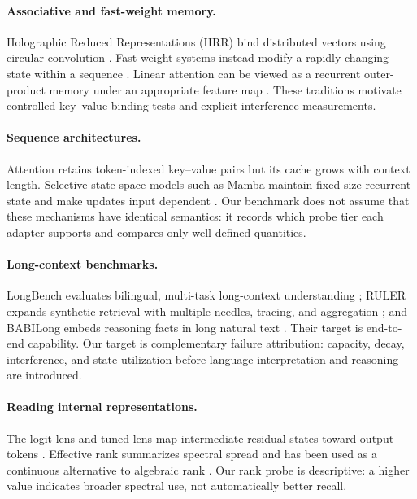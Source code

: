 \documentclass[10pt,twocolumn]{article}
\begin{document}
\paragraph{Associative and fast-weight memory.}
Holographic Reduced Representations (HRR) bind distributed vectors using
circular convolution \cite{plate1995hrr}.  Fast-weight systems instead modify
a rapidly changing state within a sequence
\cite{schmidhuber1992fastweights,ba2016fastweights}.  Linear attention can be
viewed as a recurrent outer-product memory under an appropriate feature map
\cite{katharopoulos2020linear}.  These traditions motivate controlled
key--value binding tests and explicit interference measurements.

\paragraph{Sequence architectures.}
Attention retains token-indexed key--value pairs but its cache grows with
context length.  Selective state-space models such as Mamba maintain
fixed-size recurrent state and make updates input dependent
\cite{gu2023mamba}.  Our benchmark does not assume that these mechanisms have
identical semantics: it records which probe tier each adapter supports and
compares only well-defined quantities.

\paragraph{Long-context benchmarks.}
LongBench evaluates bilingual, multi-task long-context understanding
\cite{bai2023longbench}; RULER expands synthetic retrieval with multiple
needles, tracing, and aggregation \cite{hsieh2024ruler}; and BABILong embeds
reasoning facts in long natural text \cite{kuratov2024babilong}.  Their target
is end-to-end capability.  Our target is complementary failure attribution:
capacity, decay, interference, and state utilization before language
interpretation and reasoning are introduced.

\paragraph{Reading internal representations.}
The logit lens and tuned lens map intermediate residual states toward output
tokens \cite{nostalgebraist2020logitlens,belrose2023tunedlens}.  Effective rank
summarizes spectral spread and has been used as a continuous alternative to
algebraic rank \cite{roy2007effectiverank}.  Our rank probe is descriptive: a
higher value indicates broader spectral use, not automatically better recall.
\end{document}
